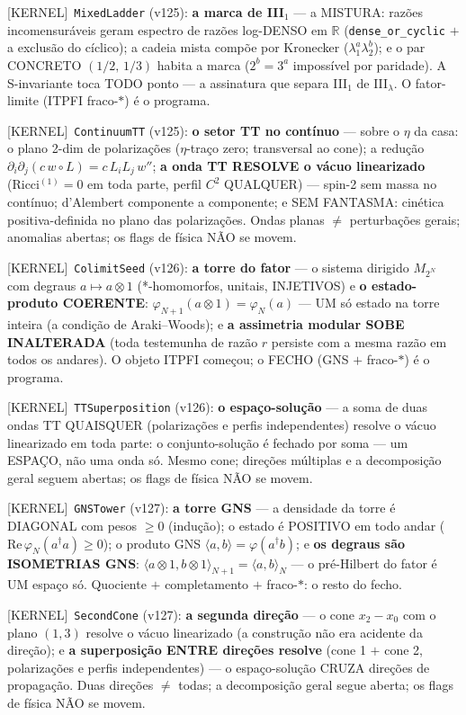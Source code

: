 \documentclass[11pt]{article}
\providecommand{\kernelmk}[1]{\textsf{[KERNEL]}~\texttt{#1}}\providecommand{\knownmk}[1]{\textsf{[KNOWN]}~{#1}}\providecommand{\statusmk}[1]{\textsf{[#1]}}
\theoremstyle{definition}\newtheorem{deriv}{Derivação}
\begin{document}
\kernelmk{MixedLadder} (v125): \textbf{a marca de III$_1$} --- a MISTURA: razões incomensuráveis geram espectro de razões log-DENSO em $\mathbb{R}$ (\texttt{dense\_or\_cyclic} $+$ a exclusão do cíclico); a cadeia mista compõe por Kronecker ($\lambda_1^a\lambda_2^b$); e o par CONCRETO $(1/2,\,1/3)$ habita a marca ($2^b=3^a$ impossível por paridade). A S-invariante toca TODO ponto — a assinatura que separa III$_1$ de III$_\lambda$. O fator-limite (ITPFI fraco-$*$) é o programa.

\kernelmk{ContinuumTT} (v125): \textbf{o setor TT no contínuo} --- sobre o $\eta$ da casa: o plano 2-dim de polarizações ($\eta$-traço zero; transversal ao cone); a redução $\partial_i\partial_j(c\,w{\circ}L)=c\,L_iL_j\,w''$; \textbf{a onda TT RESOLVE o vácuo linearizado} (Ricci$^{(1)}=0$ em toda parte, perfil $C^2$ QUALQUER) --- spin-2 sem massa no contínuo; d'Alembert componente a componente; e SEM FANTASMA: cinética positiva-definida no plano das polarizações. Ondas planas $\neq$ perturbações gerais; anomalias abertas; os flags de física NÃO se movem.

\kernelmk{ColimitSeed} (v126): \textbf{a torre do fator} --- o sistema dirigido $M_{2^N}$ com degraus $a\mapsto a\otimes1$ (*-homomorfos, unitais, INJETIVOS) e \textbf{o estado-produto COERENTE}: $\varphi_{N+1}(a\otimes 1)=\varphi_N(a)$ --- UM só estado na torre inteira (a condição de Araki--Woods); e \textbf{a assimetria modular SOBE INALTERADA} (toda testemunha de razão $r$ persiste com a mesma razão em todos os andares). O objeto ITPFI começou; o FECHO (GNS $+$ fraco-$*$) é o programa.

\kernelmk{TTSuperposition} (v126): \textbf{o espaço-solução} --- a soma de duas ondas TT QUAISQUER (polarizações e perfis independentes) resolve o vácuo linearizado em toda parte: o conjunto-solução é fechado por soma --- um ESPAÇO, não uma onda só. Mesmo cone; direções múltiplas e a decomposição geral seguem abertas; os flags de física NÃO se movem.

\kernelmk{GNSTower} (v127): \textbf{a torre GNS} --- a densidade da torre é DIAGONAL com pesos $\geq 0$ (indução); o estado é POSITIVO em todo andar ($\mathrm{Re}\,\varphi_N(a^\dagger a)\geq 0$); o produto GNS $\langle a,b\rangle=\varphi(a^\dagger b)$; e \textbf{os degraus são ISOMETRIAS GNS}: $\langle a\otimes1,b\otimes1\rangle_{N+1}=\langle a,b\rangle_N$ --- o pré-Hilbert do fator é UM espaço só. Quociente $+$ completamento $+$ fraco-$*$: o resto do fecho.

\kernelmk{SecondCone} (v127): \textbf{a segunda direção} --- o cone $x_2{-}x_0$ com o plano $(1,3)$ resolve o vácuo linearizado (a construção não era acidente da direção); e \textbf{a superposição ENTRE direções resolve} (cone 1 $+$ cone 2, polarizações e perfis independentes) --- o espaço-solução CRUZA direções de propagação. Duas direções $\neq$ todas; a decomposição geral segue aberta; os flags de física NÃO se movem.
\end{document}
